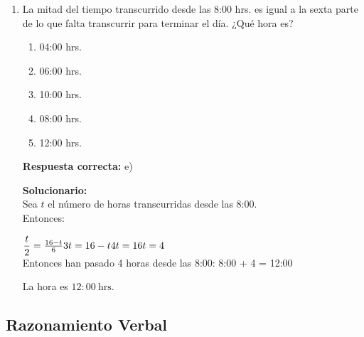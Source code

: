 \begin{enumerate}
	\vspace{6mm}
	
	\item La mitad del tiempo transcurrido desde las 8:00 hrs. es igual a la sexta parte de lo que falta transcurrir para terminar el día. ¿Qué hora es?
	\begin{enumerate}[label=\alph*)]
		\item 04:00 hrs.
		\item 06:00 hrs.
		\item 10:00 hrs.
		\item 08:00 hrs.
		\item 12:00 hrs.
	\end{enumerate}
	\textbf{Respuesta correcta:} e)
	
	\vspace{2mm}
	\textbf{Solucionario:}\\
	Sea \(t\) el número de horas transcurridas desde las 8:00.\\
	Entonces:

	$\dfrac{t}{2}=\frac{16-t}{6}\\
	3t = 16 - t\\
	4t = 16\\
	t=4$\\
	Entonces han pasado 4 horas desde las 8:00:
	8:00 + 4 = 12:00

	La hora es \(\boxed{12:00\ \text{hrs.}}\)
	
	\vspace{6mm}
	
\end{enumerate}

\subsection*{Razonamiento Verbal}

